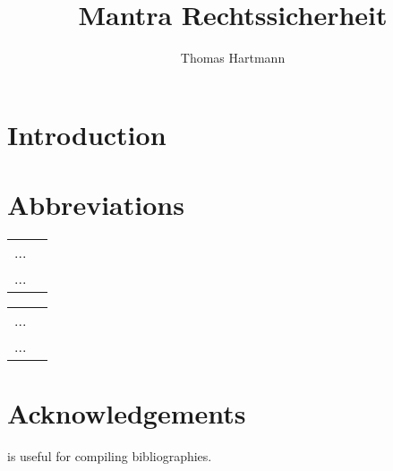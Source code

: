 \documentclass[output=paper]{langscibook}
\author{Thomas Hartmann}
\title{Mantra Rechtssicherheit}
\begin{document}
\maketitle

\section{Introduction}
 
 
\section*{Abbreviations}
\begin{tabularx}{.45\textwidth}{lQ}
... & \\
... & \\
\end{tabularx}
\begin{tabularx}{.45\textwidth}{lQ}
... & \\
... & \\
\end{tabularx}


\section*{Acknowledgements}
\citet{Nordhoff2018} is useful for compiling bibliographies.

{\sloppy\printbibliography[heading=subbibliography,notkeyword=this]}
\end{document}
